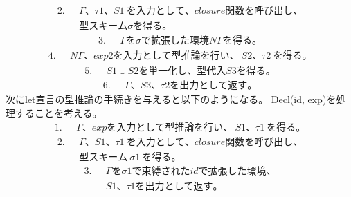 \documentclass{jreport}
\begin{document}
\begin{equation}
  \begin{split}
      2. \ \ \ &\Gamma、\tau1、S1 \ を入力として、closure関数を呼び出し、\\ &型スキーム \sigma を得る。
  \end{split}
\end{equation}
\begin{equation}
  \begin{split}
    3. \ \ \ &\Gamma を \sigma で拡張した環境 N\Gamma を得る。
  \end{split}
\end{equation}
\begin{equation}
  \begin{split}
    4. \ \ \ &N\Gamma、exp2 を入力として型推論を行い、\ S2、\tau2 \ を得る。
  \end{split}
\end{equation}
\begin{equation}
  \begin{split}
    5. \ \ \ &S1 \cup S2 を単一化し、型代入S3を得る。
  \end{split}
\end{equation}
\begin{equation}
  \begin{split}
    6. \ \ \ &\Gamma、S3、\tau2 を出力として返す。
  \end{split}
\end{equation}
次にlet宣言の型推論の手続きを与えると以下のようになる。
Decl(id, exp)を処理することを考える。
\begin{equation}
  \begin{split}
    1. \ \ \ &\Gamma、exp を入力として型推論を行い、\ S1、\tau1 \ を得る。
  \end{split}
\end{equation}
\begin{equation}
  \begin{split}
    2. \ \ \ &\Gamma、S1、\tau1 \ を入力として、closure関数を呼び出し、\\ &
    型スキーム \ \sigma1 \ を得る。
  \end{split}
\end{equation}
\begin{equation}
  \begin{split}
    3. \ \ \ &\Gamma を \sigma1 で束縛されたidで拡張した環境、\\ &
    S1、\tau1を出力として返す。
  \end{split}
\end{equation}
\end{document}
